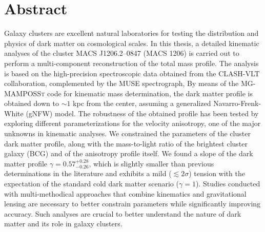 \chapter{Abstract}
Galaxy clusters are excellent natural laboratories for testing the distribution and physics of dark matter on cosmological scales. In this thesis, a detailed kinematic analyses of the cluster MACS J1206.2–0847 (MACS 1206) is carried out to perform a multi-component reconstruction of the total mass profile. The analysis is based on the high-precision spectroscopic data obtained from the CLASH-VLT collaboration, complemented by the MUSE spectrograph, By means of the \textsc{MG-MAMPOSSt} code for kinematic mass determination, the dark matter profile is obtained down to $\sim 1$ kpc from the center, assuming a generalized Navarro-Frenk-White (gNFW) model. The robustness of the obtained profile has been tested by exploring different parameterizations for the velocity anisotropy, one of the major unknowns in kinematic analyses. We constrained the parameters of the cluster dark matter profile, along with the mass-to-light ratio of the brightest cluster galaxy (BCG) and of the anisotropy profile itself. We found a slope of the dark matter profile $\gamma = 0.57^{+0.28}_{-0.26}$, which is slightly smaller than previous determinations in the literature and exhibits a mild ($\lesssim 2 \sigma$) tension with the expectation of the standard cold dark matter scenario ($\gamma = 1$). Studies conducted with multi-methodical approaches that combine kinematics and gravitational lensing are necessary to better constrain parameters while significantly improving accuracy. Such analyses are crucial to better understand the nature of dark matter and its role in galaxy clusters.